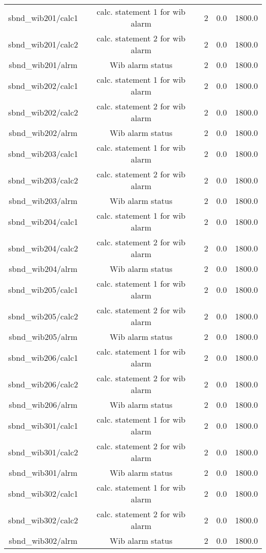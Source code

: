 \begin{table}[ptb]
\begin{tabular}{c | c c c c}
sbnd_wib201/calc1 & calc. statement 1 for wib alarm & 2 & 0.0 & 1800.0\\ 
sbnd_wib201/calc2 & calc. statement 2 for wib alarm & 2 & 0.0 & 1800.0\\ 
sbnd_wib201/alrm & Wib alarm status & 2 & 0.0 & 1800.0\\ 
sbnd_wib202/calc1 & calc. statement 1 for wib alarm & 2 & 0.0 & 1800.0\\ 
sbnd_wib202/calc2 & calc. statement 2 for wib alarm & 2 & 0.0 & 1800.0\\ 
sbnd_wib202/alrm & Wib alarm status & 2 & 0.0 & 1800.0\\ 
sbnd_wib203/calc1 & calc. statement 1 for wib alarm & 2 & 0.0 & 1800.0\\ 
sbnd_wib203/calc2 & calc. statement 2 for wib alarm & 2 & 0.0 & 1800.0\\ 
sbnd_wib203/alrm & Wib alarm status & 2 & 0.0 & 1800.0\\ 
sbnd_wib204/calc1 & calc. statement 1 for wib alarm & 2 & 0.0 & 1800.0\\ 
sbnd_wib204/calc2 & calc. statement 2 for wib alarm & 2 & 0.0 & 1800.0\\ 
sbnd_wib204/alrm & Wib alarm status & 2 & 0.0 & 1800.0\\ 
sbnd_wib205/calc1 & calc. statement 1 for wib alarm & 2 & 0.0 & 1800.0\\ 
sbnd_wib205/calc2 & calc. statement 2 for wib alarm & 2 & 0.0 & 1800.0\\ 
sbnd_wib205/alrm & Wib alarm status & 2 & 0.0 & 1800.0\\ 
sbnd_wib206/calc1 & calc. statement 1 for wib alarm & 2 & 0.0 & 1800.0\\ 
sbnd_wib206/calc2 & calc. statement 2 for wib alarm & 2 & 0.0 & 1800.0\\ 
sbnd_wib206/alrm & Wib alarm status & 2 & 0.0 & 1800.0\\ 
sbnd_wib301/calc1 & calc. statement 1 for wib alarm & 2 & 0.0 & 1800.0\\ 
sbnd_wib301/calc2 & calc. statement 2 for wib alarm & 2 & 0.0 & 1800.0\\ 
sbnd_wib301/alrm & Wib alarm status & 2 & 0.0 & 1800.0\\ 
sbnd_wib302/calc1 & calc. statement 1 for wib alarm & 2 & 0.0 & 1800.0\\ 
sbnd_wib302/calc2 & calc. statement 2 for wib alarm & 2 & 0.0 & 1800.0\\ 
sbnd_wib302/alrm & Wib alarm status & 2 & 0.0 & 1800.0\\ 

\end{tabular}
\end{table}
